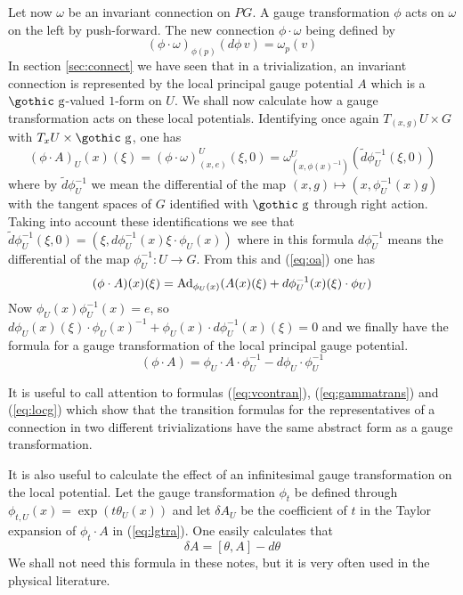 \documentclass[12pt,titlepage]{article}
\def\goth#1{\hbox{\gothic #1}}
\def\gg{{\goth g}}
\def\Ad{\hbox{Ad}}
\begin{document}
Let now \(\omega\) be an invariant connection on \(PG\). A gauge
transformation \(\phi\) acts on \(\omega\) on the left by push-forward. The
new connection \(\phi\cdot\omega\)
% 
being defined by
\begin{equation}
(\phi\cdot \omega)_{\phi(p)}(d\phi\, v) = \omega_p(v)
\end{equation}%
In section \ref{sec:connect} we have seen that in a 
trivialization, an invariant connection is represented by the local
principal gauge potential \(A\) which is a \(\gg\)-valued
\(1\)-form on \(U\). We shall now calculate how a
gauge transformation acts on these local potentials. Identifying once
again \(T_{(x,g)}U\times G\) with \(T_xU \times \gg\), one has
\[
(\phi\cdot A )_U(x)(\xi) = (\phi\cdot \omega)^U_{(x,e)}(\xi,0) =
\omega^U _{(x,\phi(x)^{-1})}(\tilde d\phi_U^{-1}(\xi,0))
\] 
%
where by
\(\tilde d\phi_U^{-1}\) we mean the differential of the map \((x,g)
\mapsto (x,\phi_U^{-1}(x)g)\) with the tangent spaces of \(G\) identified
with \(\gg\) through right action. Taking into account these
identifications we see that \(\tilde d\phi_U^{-1}(\xi ,0) = (\xi,
d\phi_U^{-1}(x)\xi\cdot \phi_U(x))\) where in this formula
\(d\phi_U^{-1}\) means the differential of the map \(\phi_U^{-1}:U \to
G\). From this and (\ref{eq:oa}) one has
\[
(\phi\cdot A )(x)(\xi) = \Ad_{\phi_U(x)}(A (x)(\xi) +
d\phi_U^{-1}(x)(\xi)\cdot \phi_U)
\]
 Now \(\phi_U(x)\phi_U^{-1}(x)
=
e\), so
\(d\phi_U(x)(\xi)\cdot\phi_U(x)^{-1} + \phi_U(x)\cdot
d\phi_U^{-1}(x)(\xi) = 0\)
and we  finally have the formula for a gauge transformation of the local
principal gauge potential.
\begin{equation}\label{eq:lgtra}
(\phi\cdot A )= \phi_U\cdot A \cdot\phi_U^{-1} -
d\phi_U\cdot\phi_U^{-1}
\end{equation}

It is useful to call attention to formulas (\ref{eq:vcontran}),
(\ref{eq:gammatrans}) and
(\ref{eq:locg}) which show that the transition formulas for the
representatives of a connection in two different trivializations have
the same abstract form as a gauge transformation. 

It is also useful to calculate the effect of an infinitesimal gauge
transformation on the local potential. Let the gauge transformation
\(\phi_t\) be defined through \(\phi_{t,U} (x) =
\exp(t\theta_U(x))\) and let \(\delta A _U\) be the coefficient of
\(t\) in the Taylor expansion of \(\phi_{t}\cdot A\) in (\ref{eq:lgtra}). 
One easily
calculates  that
\[
\delta A = [\theta,A ] - d\theta
\]%
We shall not need this formula in these notes, but it is very often
used in the physical literature. 
\end{document}
